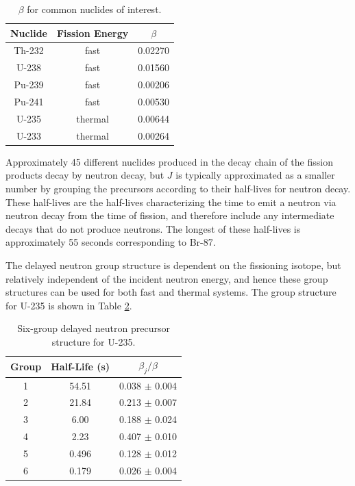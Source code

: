 \begin{table}[H] 
\caption{\(\beta\) for common nuclides of interest.}
\centering
\begin{tabular}{c c c}
\hline\hline
Nuclide & Fission Energy & \(\beta\)\\
\hline
Th-232 & fast & 0.02270\\
U-238 & fast  & 0.01560\\
Pu-239 & fast & 0.00206\\
Pu-241 & fast & 0.00530 \\
U-235 & thermal & 0.00644 \\
U-233 & thermal & 0.00264 \\
\hline
\end{tabular}
\label{table:beta}
\end{table}

Approximately 45 different nuclides produced in the decay chain of the fission products decay by neutron decay, but \(J\) is typically approximated as a smaller number by grouping the precursors according to their half-lives for neutron decay. These half-lives are the half-lives characterizing the time to emit a neutron via neutron decay from the time of fission, and therefore include any intermediate decays that do not produce neutrons. The longest of these half-lives is approximately 55 seconds corresponding to Br-87.

The delayed neutron group structure is dependent on the fissioning isotope, but relatively independent of the incident neutron energy, and hence these group structures can be used for both fast and thermal systems. The group structure for U-235 is shown in Table \ref{table:U235_delayed}.

\begin{table}[H]
\caption{Six-group delayed neutron precursor structure for U-235.}
\centering
\begin{tabular}{c c c}
\hline\hline
Group & Half-Life (s) & \(\beta_j/\beta\)\\ [0.5ex]
\hline
1 & 54.51 & 0.038 \(\pm\) 0.004\\
2 & 21.84 & 0.213 \(\pm\) 0.007\\
3 & 6.00 & 0.188 \(\pm\) 0.024\\
4 & 2.23 & 0.407 \(\pm\) 0.010\\
5 & 0.496 & 0.128 \(\pm\) 0.012\\
6 & 0.179 & 0.026 \(\pm\) 0.004\\
\hline
\end{tabular}
\label{table:U235_delayed}
\end{table}

